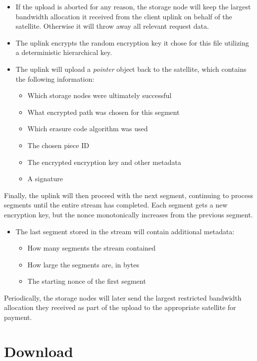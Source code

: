 \documentclass[11pt,fleqn,openany]{book}
\begin{document}
\begin{itemize}
\item If the upload is aborted for any reason, the storage node will keep the
  largest bandwidth allocation it received from the client uplink on behalf of
  the satellite. Otherwise it will throw away all relevant request data.
\item The uplink encrypts the random encryption key it chose for this file
  utilizing a deterministic hierarchical key.
\item The uplink will upload a {\em pointer} object back to the satellite, which
  contains the following information:
  \begin{itemize}
  \item Which storage nodes were ultimately successful
  \item What encrypted path was chosen for this segment
  \item Which erasure code algorithm was used
  \item The chosen piece ID
  \item The encrypted encryption key and other metadata
  \item A signature
  \end{itemize}
\end{itemize}

Finally, the uplink will then proceed with the next segment, continuing to
process segments until the entire stream has completed. Each segment gets
a new encryption key, but the nonce monotonically increases from the previous
segment.

\begin{itemize}
\item The last segment stored in the stream will contain additional metadata:
  \begin{itemize}
  \item How many segments the stream contained
  \item How large the segments are, in bytes
  \item The starting nonce of the first segment
  \end{itemize}
\end{itemize}

Periodically, the storage nodes will later send the largest restricted
bandwidth allocation they received as part of the upload to the appropriate
satellite for payment.

\section{Download}
\end{document}
